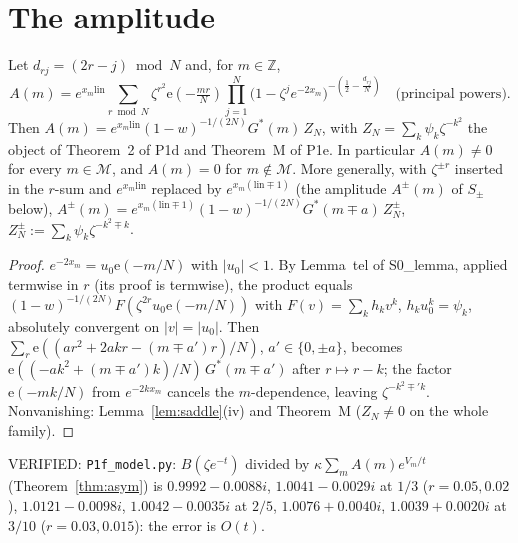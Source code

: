 \documentclass[11pt]{article}
\theoremstyle{definition}\newtheorem{definition}[theorem]{Definition}
\theoremstyle{remark}\newtheorem{remark}[theorem]{Remark}
\newcommand{\e}{\mathrm{e}}
\begin{document}
\section{The amplitude}\label{sec:amp}
\begin{lemma}[PROVED]\label{lem:amp}
Let $d_{rj}=(2r-j)\bmod N$ and, for $m\in\mathbb Z$,
\[A(m)=e^{x_m\mathrm{lin}}\sum_{r\bmod N}\zeta^{r^2}\e(-\tfrac{mr}N)\prod_{j=1}^N\big(1-\zeta^je^{-2x_m}\big)^{-(\frac12-\frac{d_{rj}}N)}\quad\text{(principal powers)}.\]
Then $A(m)=e^{x_m\mathrm{lin}}(1-w)^{-1/(2N)}G^*(m)\,Z_N$, with $Z_N=\sum_k\psi_k\zeta^{-k^2}$ the object of Theorem~2 of P1d and Theorem~M of P1e. In particular $A(m)\ne0$ for every $m\in\mathcal M$, and $A(m)=0$ for $m\notin\mathcal M$.
More generally, with $\zeta^{\pm r}$ inserted in the $r$-sum and $e^{x_m\mathrm{lin}}$ replaced by $e^{x_m(\mathrm{lin}\mp1)}$ (the amplitude $A^\pm(m)$ of $S_\pm$ below),
$A^\pm(m)=e^{x_m(\mathrm{lin}\mp1)}(1-w)^{-1/(2N)}G^*(m\mp a)\,Z^\pm_N$, $Z^\pm_N:=\sum_k\psi_k\zeta^{-k^2\mp k}$.
\end{lemma}
\begin{proof}
$e^{-2x_m}=u_0\e(-m/N)$ with $|u_0|<1$. By Lemma~tel of S0\_lemma, applied termwise in $r$ (its proof is termwise), the product equals $(1-w)^{-1/(2N)}F(\zeta^{2r}u_0\e(-m/N))$ with $F(v)=\sum_kh_kv^k$, $h_ku_0^k=\psi_k$, absolutely convergent on $|v|=|u_0|$. Then
$\sum_r\e((ar^2+2akr-(m\mp a')r)/N)$, $a'\in\{0,\pm a\}$, becomes $\e((-ak^2+(m\mp a')k)/N)\,G^*(m\mp a')$ after $r\mapsto r-k$; the factor $\e(-mk/N)$ from $e^{-2kx_m}$ cancels the $m$-dependence, leaving $\zeta^{-k^2\mp' k}$. Nonvanishing: Lemma~\ref{lem:saddle}(iv) and Theorem~M ($Z_N\ne0$ on the whole family).
\end{proof}
VERIFIED: \texttt{P1f\_model.py}: $B(\zeta e^{-t})$ divided by $\kappa\sum_mA(m)e^{V_m/t}$ (Theorem~\ref{thm:asym}) is $0.9992-0.0088i$, $1.0041-0.0029i$ at $1/3$ ($r=0.05,0.02$), $1.0121-0.0098i$, $1.0042-0.0035i$ at $2/5$, $1.0076+0.0040i$, $1.0039+0.0020i$ at $3/10$ ($r=0.03,0.015$): the error is $O(t)$.
\end{document}
